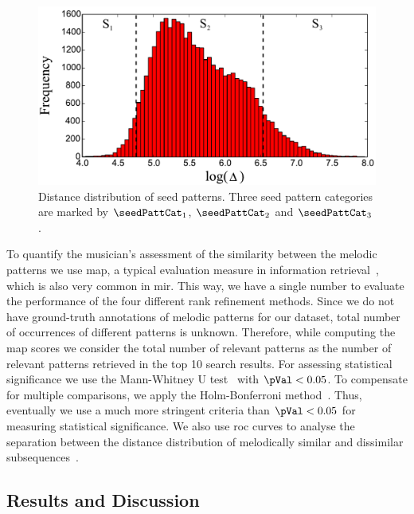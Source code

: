 \begin{figure}
	\begin{center}
		\includegraphics[width=\figSizeEightyFive]{ch06_patterns/figures/discovery/SeedDistribution.pdf}
	\end{center}
	\caption[Distance distribution of seed melodic patterns]{Distance distribution of seed patterns. Three seed pattern categories are marked by $\seedPattCat_1$, $\seedPattCat_2$ and $\seedPattCat_3$.}
	\label{fig:SeedPatternsDistanceDistribution}
\end{figure}


To quantify the musician's assessment of the similarity between the melodic patterns we use \gls{map}, a typical evaluation measure in information retrieval~\citep{manning2008introduction}, which is also very common in \gls{mir}. This way, we have a single number to evaluate the performance of the four different rank refinement methods. Since we do not have ground-truth annotations of melodic patterns for our dataset, total number of occurrences of different patterns is unknown. Therefore, while computing the \gls{map} scores we consider the total number of relevant patterns as the number of relevant patterns retrieved in the top 10 search results. For assessing statistical significance we use the Mann-Whitney U test~\citep{mann1947test} with $\pVal < 0.05$. To compensate for multiple comparisons, we apply the Holm-Bonferroni method~\citep{holm1979simple}. Thus, eventually we use a much more stringent criteria than $\pVal < 0.05$ for measuring statistical significance. We also use \acrshort{roc} curves to analyse the separation between the distance distribution of melodically similar and dissimilar subsequences~\citep{manning2008introduction}. 


\subsection{Results and Discussion}
\label{sec:patterns_discovery_results}

